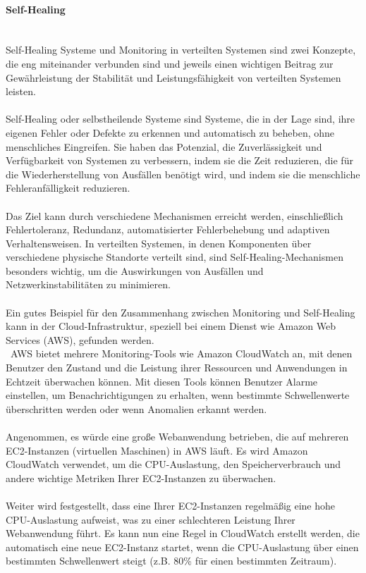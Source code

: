 \documentclass[../vs-script-first-v01.tex]{subfiles}
\begin{document}
\paragraph{Self-Healing\\\\}
Self-Healing Systeme und Monitoring in verteilten Systemen sind zwei Konzepte, die eng miteinander verbunden sind und jeweils einen wichtigen Beitrag zur Gewährleistung der Stabilität und Leistungsfähigkeit von verteilten Systemen leisten.
\\\\
Self-Healing oder selbstheilende Systeme sind Systeme, die in der Lage sind, ihre eigenen Fehler oder Defekte zu erkennen und automatisch zu beheben, ohne menschliches Eingreifen. Sie haben das Potenzial, die Zuverlässigkeit und Verfügbarkeit von Systemen zu verbessern, indem sie die Zeit reduzieren, die für die Wiederherstellung von Ausfällen benötigt wird, und indem sie die menschliche Fehleranfälligkeit reduzieren.
\\\\
Das Ziel kann durch verschiedene Mechanismen erreicht werden, einschließlich Fehlertoleranz, Redundanz, automatisierter Fehlerbehebung und adaptiven Verhaltensweisen. In verteilten Systemen, in denen Komponenten über verschiedene physische Standorte verteilt sind, sind Self-Healing-Mechanismen besonders wichtig, um die Auswirkungen von Ausfällen und Netzwerkinstabilitäten zu minimieren.
\\\\
Ein gutes Beispiel für den Zusammenhang zwischen Monitoring und Self-Healing kann in der Cloud-Infrastruktur, speziell bei einem Dienst wie Amazon Web Services (AWS), gefunden werden.
\\\
AWS bietet mehrere Monitoring-Tools wie Amazon CloudWatch an, mit denen Benutzer den Zustand und die Leistung ihrer Ressourcen und Anwendungen in Echtzeit überwachen können. Mit diesen Tools können Benutzer Alarme einstellen, um Benachrichtigungen zu erhalten, wenn bestimmte Schwellenwerte überschritten werden oder wenn Anomalien erkannt werden.
\\\\
Angenommen, es würde  eine große Webanwendung betrieben, die auf mehreren EC2-Instanzen (virtuellen Maschinen) in AWS läuft. Es wird  Amazon CloudWatch verwendet, um die CPU-Auslastung, den Speicherverbrauch und andere wichtige Metriken Ihrer EC2-Instanzen zu überwachen.
\\\\
Weiter wird festgestellt, dass eine Ihrer EC2-Instanzen regelmäßig eine hohe CPU-Auslastung aufweist, was zu einer schlechteren Leistung Ihrer Webanwendung führt. Es kann nun eine Regel in CloudWatch erstellt werden, die automatisch eine neue EC2-Instanz startet, wenn die CPU-Auslastung über einen bestimmten Schwellenwert steigt (z.B. 80\% für einen bestimmten Zeitraum).
\end{document}
